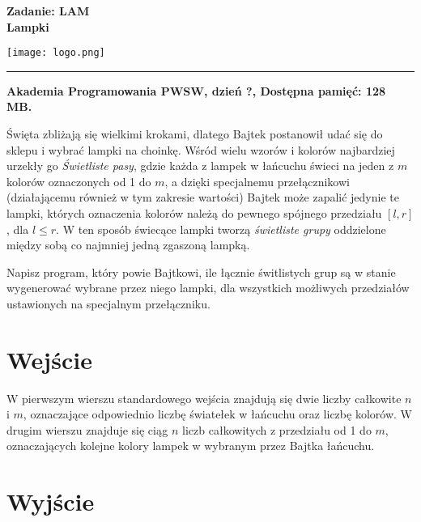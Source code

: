 \documentclass[10pt]{article}
\begin{document}
    

    \noindent
    \begin{minipage}{0.5\textwidth}
        \LARGE{\textsf{\textbf{Zadanie: LAM\\Lampki}}}
    \end{minipage}
    \begin{minipage}{0.5\textwidth}
        \begin{flushright}
            \texttt{[image: logo.png]}
        \end{flushright}
    \end{minipage}
    
    \noindent\rule{\textwidth}{0.4pt}
    
    \noindent\textbf{Akademia Programowania PWSW, dzień ?, Dostępna pamięć: 128 MB.}
    \vspace{1em}
    
    
    \noindent
    Święta zbliżają się wielkimi krokami, dlatego Bajtek postanowił udać się do sklepu i wybrać lampki na choinkę. Wśród wielu wzorów i kolorów najbardziej urzekły go \textit{Świetliste pasy}, gdzie każda z lampek w łańcuchu świeci na jeden z $m$ kolorów oznaczonych od 1 do $m$, a dzięki specjalnemu przełącznikowi (działającemu również w tym zakresie wartości) Bajtek może zapalić jedynie te lampki, których oznaczenia kolorów należą do pewnego spójnego przedziału $[l, r]$, dla $l \leq r$. W ten sposób świecące lampki tworzą \textit{świetliste grupy} oddzielone między sobą co najmniej jedną zgaszoną lampką.

    Napisz program, który powie Bajtkowi, ile łącznie świtlistych grup są w stanie wygenerować wybrane przez niego lampki, dla wszystkich możliwych przedziałów ustawionych na specjalnym przełączniku.


    \section*{Wejście}
    
    W pierwszym wierszu standardowego wejścia znajdują się dwie liczby całkowite $n$ i $m$, oznaczające odpowiednio liczbę światełek w łańcuchu oraz liczbę kolorów. W drugim wierszu znajduje się ciąg $n$ liczb całkowitych z przedziału od 1 do $m$, oznaczających kolejne kolory lampek w wybranym przez Bajtka łańcuchu.


    \section*{Wyjście}
    
\end{document}
